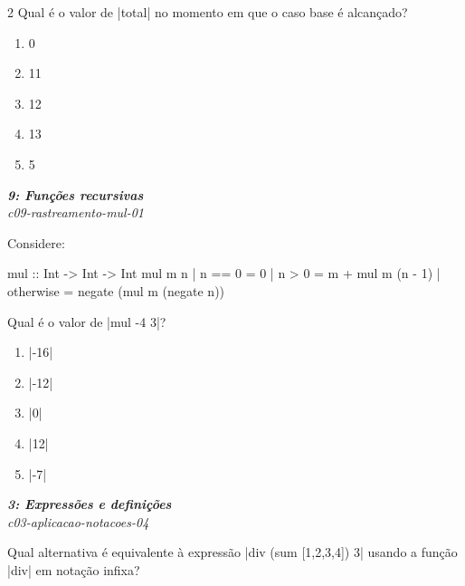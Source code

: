 \documentclass[a4paper,10pt,brazil]{article}
\begin{document}
\begin{multicols}{2}
Qual é o valor de \haskellinline|total| no momento em que o caso base é alcançado?

\begin{enumerate}
  \item 0

  \item 11

  \item 12

  \item 13

  \item 5


\end{enumerate}

\begin{flushright}
  \footnotesize
  \textit{\textbf{9: Funções recursivas}}\\
  \textit{c09-rastreamento-mul-01}\\

\end{flushright}
Considere:
\begin{haskellcode}
mul :: Int -> Int -> Int
mul m n
  | n == 0    = 0
  | n > 0     = m + mul m (n - 1)
  | otherwise = negate (mul m (negate n))
\end{haskellcode}
Qual é o valor de \haskellinline|mul -4 3|?

\begin{enumerate}
  \item \haskellinline|-16|

  \item \haskellinline|-12|

  \item \haskellinline|0|

  \item \haskellinline|12|

  \item \haskellinline|-7|


\end{enumerate}

\begin{flushright}
  \footnotesize
  \textit{\textbf{3: Expressões e definições}}\\
  \textit{c03-aplicacao-notacoes-04}\\

\end{flushright}
Qual alternativa é equivalente à expressão \haskellinline|div (sum [1,2,3,4]) 3| usando a função \haskellinline|div| em notação infixa?


\end{multicols}
\end{document}
